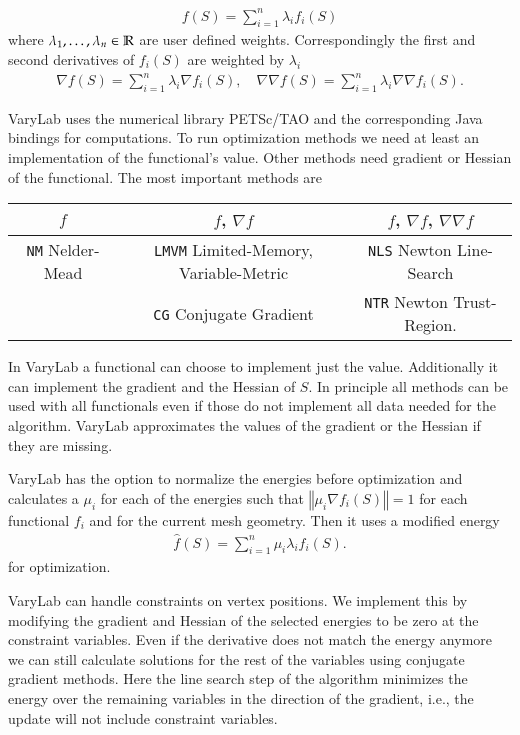 \documentclass[Thesis.tex]{subfiles}
\begin{document}
\begin{eqnarray}
	f(S) = \sum_{i=1}^n \lambda_i f_i(S) \label{eq:varylab_functional}
\end{eqnarray}
where $\lambda_1,\ldots,\lambda_n\in \mathbb R$ are user defined weights. Correspondingly the first and second  derivatives of $f_i(S)$ are weighted by $\lambda_i$
\begin{eqnarray}
	\nabla f(S) = \sum_{i=1}^n \lambda_i \nabla f_i(S), \quad \nabla\nabla f(S) = \sum_{i=1}^n \lambda_i \nabla\nabla f_i(S). \label{eq:varylab_derivatives}
\end{eqnarray}

{\sc VaryLab} uses the numerical library {\sc PETSc}/{\sc TAO} \cite{petsc-user-ref, petsc-web-page, tao-user-ref} and the corresponding {\sc Java} bindings \cite{jpetsctao-web-page} for computations. To run optimization methods we need at least an implementation of the functional's value. Other methods need gradient or Hessian of the functional. The most important methods are
 
\begin{tabular}{c | c | c}
	$f$ & $f$, $\nabla f$ & $f$, $\nabla f$, $\nabla\nabla f$\\ \hline
	{\tt NM} Nelder-Mead & {\tt LMVM} Limited-Memory, Variable-Metric & {\tt NLS} Newton Line-Search \\
	& {\tt CG} Conjugate Gradient & {\tt NTR} Newton Trust-Region.
\end{tabular}

In {\sc VaryLab} a functional can choose to implement just the value. Additionally it can implement the gradient and the Hessian of $S$. In principle all methods can be used with all functionals even if those do not implement all data needed for the algorithm. {\sc VaryLab} approximates the values of the gradient or the Hessian if they are missing.

{\sc VaryLab} has the option to normalize the energies before optimization and calculates a $\mu_i$ for each of the energies such that 	$\left\Vert\mu_i\nabla f_i(S)\right\Vert = 1$ for each functional $f_i$ and for the current mesh geometry. Then it uses a modified energy
\begin{eqnarray}
	\hat{\mathit f}(S) = \sum_{i=1}^n \mu_i\lambda_i f_i(S). \label{eq:varylab_normalized_functional}
\end{eqnarray}
for optimization.

{\sc VaryLab} can handle constraints on vertex positions. We implement this by modifying the gradient and Hessian of the selected energies to be zero at the constraint variables. Even if the derivative does not match the energy anymore we can still calculate solutions for the rest of the variables using conjugate gradient methods. Here the line search step of the algorithm minimizes the energy over the remaining variables in the direction of the gradient, i.e., the update will not include constraint variables.
\end{document}
